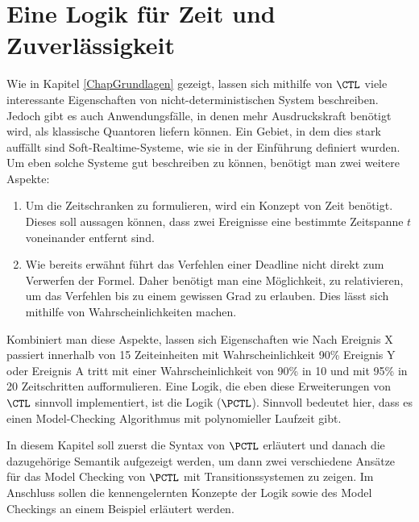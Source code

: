\section{Eine Logik für Zeit und Zuverlässigkeit}
\label{ChapSyntaxSemantik}


Wie in Kapitel \ref{ChapGrundlagen} gezeigt, lassen sich mithilfe von $\CTL$ viele interessante Eigenschaften von nicht-deterministischen System beschreiben. 
Jedoch gibt es auch Anwendungsfälle, in denen mehr Ausdruckskraft benötigt wird, als klassische Quantoren liefern können.
Ein Gebiet, in dem dies stark auffällt sind Soft-Realtime-Systeme, wie sie in der Einführung definiert wurden. 
Um eben solche Systeme gut beschreiben zu können, benötigt man zwei weitere Aspekte:
\begin{enumerate}
	\item Um die Zeitschranken zu formulieren, wird ein Konzept von Zeit benötigt. Dieses soll aussagen können, dass zwei Ereignisse eine bestimmte Zeitspanne $t$ voneinander entfernt sind.
	\item Wie bereits erwähnt führt das Verfehlen einer Deadline nicht direkt zum Verwerfen der Formel. Daher benötigt man eine Möglichkeit, zu relativieren, um das Verfehlen bis zu einem gewissen Grad zu erlauben. 
	Dies lässt sich mithilfe von Wahrscheinlichkeiten machen. 
\end{enumerate}
Kombiniert man diese Aspekte, lassen sich Eigenschaften wie \glqq Nach Ereignis X passiert innerhalb von 15 Zeiteinheiten mit Wahrscheinlichkeit 90\% Ereignis Y\grqq{} oder \glqq Ereignis A tritt mit einer Wahrscheinlichkeit von 90\% in 10 und mit 95\% in 20 Zeitschritten auf\grqq formulieren. 
Eine Logik, die eben diese Erweiterungen von $\CTL$ sinnvoll implementiert, ist die Logik  ($\PCTL$). 
Sinnvoll bedeutet hier, dass es einen Model-Checking Algorithmus mit polynomieller Laufzeit gibt. 

In diesem Kapitel soll zuerst die Syntax von $\PCTL$ erläutert und danach die dazugehörige Semantik aufgezeigt werden, um dann zwei verschiedene Ansätze für das Model Checking von $\PCTL$ mit Transitionssystemen zu zeigen. 
Im Anschluss sollen die kennengelernten Konzepte der Logik sowie des Model Checkings an einem Beispiel erläutert werden.

